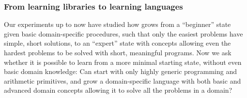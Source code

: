 \documentclass[12pt]{article}
\begin{document}
\subsubsection*{From learning libraries to learning languages}\label{librariesToLanguages}

%
%


Our experiments up to now have studied how \system grows from a ``beginner'' state given basic domain-specific procedures, such that only the easiest problems have simple, short solutions, to an ``expert'' state with concepts allowing even the %
hardest problems to be solved with short, meaningful programs.  Now we ask whether it is possible to learn from a more minimal starting state, without even basic domain knowledge: Can \system start with only highly generic programming and arithmetic primitives, %
and grow a domain-specific language with both basic  
and advanced domain concepts allowing it to solve all the problems in a domain?  %
\end{document}
